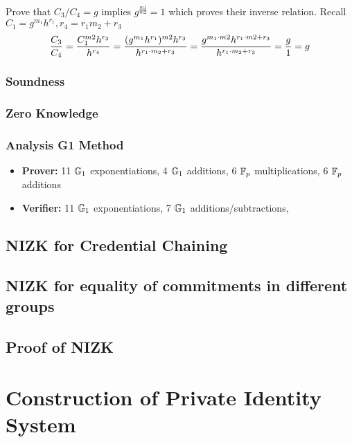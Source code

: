 Prove that $C_3/C_4 = g$ implies $g^{\frac{m1}{m2}} = 1$ which proves their inverse relation. Recall $C_1 = g^{m_1}h^{r_1}, r_4 = r_1m_2 + r_3$
\begin{align}
    \dfrac{C_3}{C_4} = \dfrac{C_1^{m2}h^{r_3}}{h^{r_4}} = \dfrac{(g^{m_1}h^{r_1})^{m2}h^{r_3}}{h^{r_1 \cdot m_2 + r_3}} = \dfrac{g^{m_1\cdot m2}h^{r_1\cdot m2 + r_3}}{h^{r_1 \cdot m_2 + r_3}} = \dfrac{g}{1} = g \notag \\
\end{align}

\subsubsection{Soundness}

\subsubsection{Zero Knowledge}

\subsubsection{Analysis G1 Method}
\begin{itemize}
    \item \textbf{Prover:} 11 $\mathbb{G}_1$ exponentiations, 4 $\mathbb{G}_1$ additions, 6 $\mathbb{F}_p$ multiplications, 6 $\mathbb{F}_p$ additions
    \item \textbf{Verifier:} 11 $\mathbb{G}_1$ exponentiations, 7 $\mathbb{G}_1$ additions/subtractions, 
\end{itemize}

\subsection{NIZK for Credential Chaining}
\subsection{NIZK for equality of commitments in different groups}




\subsection{Proof of NIZK}


\cleardoublepage


\section{Construction of Private Identity System}




